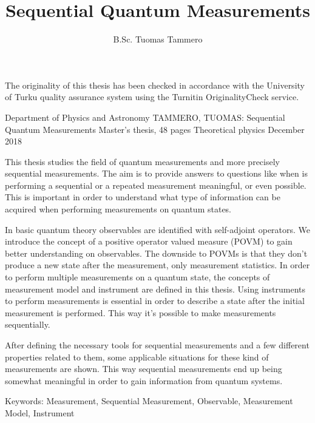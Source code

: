 \documentclass[a4paper,12pt]{wihuri}
\theoremstyle{definition}
\numberwithin{definition}{section}
\numberwithin{example}{section}
\numberwithin{theorem}{section}
\numberwithin{proposition}{section}
\numberwithin{lemma}{section}
\begin{document}
\title{Sequential Quantum Measurements}%
\author{B.Sc. Tuomas Tammero}
\maketitle

\newpage%
\thispagestyle{empty}
\null
\vfill

\noindent The originality of this thesis has been checked in accordance with the University of Turku quality assurance system using the Turnitin OriginalityCheck service.

\newpage
\thispagestyle{empty}
\begin{tiivistelma}%
        {Department of Physics and Astronomy}%
        {TAMMERO, TUOMAS:}%
        {Sequential Quantum Measurements}%
        {Master's thesis, 48 pages}%
        {Theoretical physics}%
        {December 2018}%

This thesis studies the field of quantum measurements and more precisely sequential measurements. The aim is to provide answers to questions like when is performing a sequential or a repeated measurement meaningful, or even possible. This is important in order to understand what type of information can be acquired when performing measurements on quantum states. 

In basic quantum theory observables are identified with self-adjoint operators. We introduce the concept of a positive operator valued measure (POVM) to gain better understanding on observables. The downside to POVMs is that they don't produce a new state after the measurement, only measurement statistics. In order to perform multiple measurements on a quantum state, the concepts of measurement model and instrument are defined in this thesis. Using instruments to perform measurements is essential in order to describe a state after the initial measurement is performed. This way it's possible to make measurements sequentially.

After defining the necessary tools for sequential measurements and a few different properties related to them, some applicable situations for these kind of measurements are shown. This way sequential measurements end up being somewhat meaningful in order to gain information from quantum systems.




\noindent Keywords: Measurement, Sequential Measurement, Observable, Measurement Model, Instrument
\end{tiivistelma}
\end{document}
